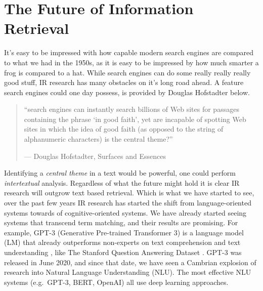 \section{The Future of Information Retrieval}

It's easy to be impressed with how capable modern search engines are compared to what we had in the 1950s, as it is easy to be impressed by how much smarter a frog is compared to a hat. While search engines can do some really really really good stuff, IR research has many obstacles on it's long road ahead. A feature search engines could one day possess, is provided by Douglas Hofstadter below.

\begin{quote}
``search engines can instantly search billions of Web sites for passages containing the phrase `in good faith', yet are incapable of spotting Web sites in which the idea of good faith (as opposed to the string of alphanumeric characters) is the central theme?''
    \begin{flushright}
        --- Douglas Hofstadter, Surfaces and Essences
    \end{flushright}
\end{quote}

Identifying a \textit{central theme} in a text would be powerful, one could perform \textit{intertextual} analysis. Regardless of what the future might hold it is clear IR research will outgrow text based retrieval. Which is what we have started to see, over the past few years IR research has started the shift from language-oriented systems towards of cognitive-oriented systems. We have already started seeing systems that transcend term matching, and their results are promising. For example, GPT-3 (Generative Pre-trained Transformer 3) is a language model (LM) that already outperforms non-experts on text comprehension and text understanding \cite{wang2019superglue}, like The Stanford Question Answering Dataset \cite{rajpurkar-etal-2016-squad}. GPT-3 was released in June 2020, and since that date, we have seen a Cambrian explosion of research into Natural Language Understanding (NLU). The most effective NLU systems (e.g.\ GPT-3, BERT, OpenAI) all use deep learning approaches.














